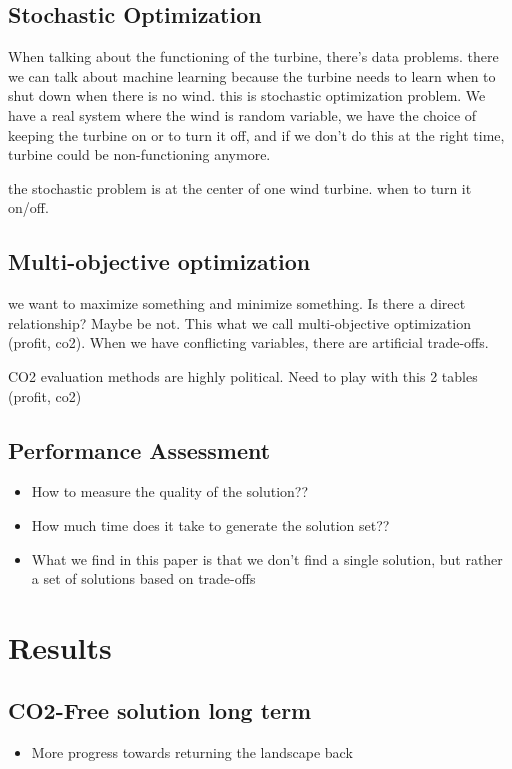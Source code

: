 \documentclass[12pt]{article}
\begin{document}
\subsection{Stochastic Optimization}
When talking about the functioning of the turbine, there's data problems.
there we can talk about machine learning because the turbine needs to learn when to shut down when there is no wind. this is stochastic optimization problem. We have a real 
system where the wind is random variable, we have the choice of keeping the turbine on or to turn it off, and if we don't do this at the right time, turbine could be non-functioning anymore. 

the stochastic problem is at the center of one wind turbine. when to turn it on/off.

\subsection{Multi-objective optimization}
we want to maximize something and minimize something. Is there a direct relationship?
Maybe be not. This what we call multi-objective optimization (profit, co2). When we have conflicting variables, there are artificial trade-offs. 

CO2 evaluation methods are highly political. Need to play with this 2 tables (profit, co2)

\subsection{Performance Assessment}
\begin{itemize}
\item How to measure the quality of the solution?? 
\item How much time does it take to generate the solution set??
\item What we find in this paper is that we don't find a single solution, but rather a set of solutions based on trade-offs
\end{itemize}


\section{Results}
\subsection{CO2-Free solution long term}
\begin{itemize}
\item More progress towards returning the landscape back
\end{itemize}
\end{document}
